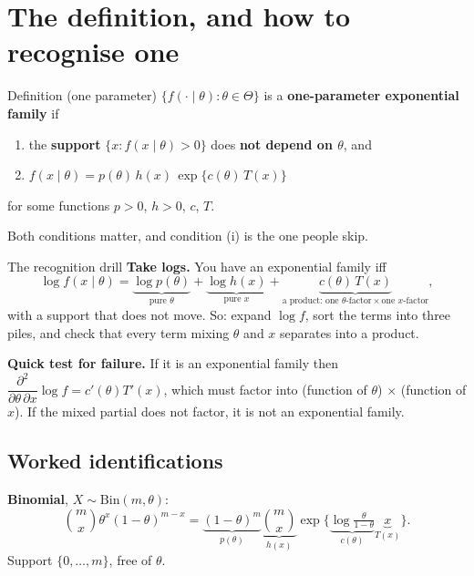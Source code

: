 \documentclass[11pt]{article}
\begin{document}
\section{The definition, and how to recognise one}

\begin{idea}{Definition (one parameter)}
$\{f(\cdot\mid\theta):\theta\in\Theta\}$ is a \textbf{one-parameter exponential family} if
\begin{enumerate}[label=(\roman*)]
\item the \textbf{support} $\{x:f(x\mid\theta)>0\}$ does \textbf{not depend on $\theta$}, and
\item $f(x\mid\theta)=p(\theta)\,h(x)\,\exp\{c(\theta)\,T(x)\}$
\end{enumerate}
for some functions $p>0$, $h>0$, $c$, $T$.
\end{idea}

Both conditions matter, and condition (i) is the one people skip.

\begin{recipe}{The recognition drill}
\textbf{Take logs.} You have an exponential family iff
\[
\log f(x\mid\theta)=\underbrace{\log p(\theta)}_{\text{pure }\theta}
+\underbrace{\log h(x)}_{\text{pure }x}
+\underbrace{c(\theta)\,T(x)}_{\text{a product: one }\theta\text{-factor}\times\text{one }x\text{-factor}} ,
\]
with a support that does not move. So: expand $\log f$, sort the terms into three piles, and
check that every term mixing $\theta$ and $x$ separates into a product.

\smallskip
\textbf{Quick test for failure.} If it is an exponential family then
$\dfrac{\partial^{2}}{\partial\theta\,\partial x}\log f=c'(\theta)T'(x)$, which must factor
into (function of $\theta$) $\times$ (function of $x$). If the mixed partial does not
factor, it is not an exponential family.
\end{recipe}

\subsection{Worked identifications}

\textbf{Binomial}, $X\sim\mathrm{Bin}(m,\theta)$:
\[
\binom mx\theta^{x}(1-\theta)^{m-x}
=\underbrace{(1-\theta)^{m}}_{p(\theta)}\underbrace{\binom mx}_{h(x)}
\exp\Big\{\underbrace{\log\tfrac{\theta}{1-\theta}}_{c(\theta)}\underbrace{x}_{T(x)}\Big\}.
\]
Support $\{0,\dots,m\}$, free of $\theta$. \checkmark
\end{document}
